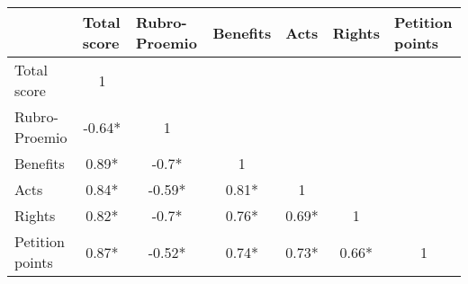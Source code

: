 \begin{tabular}{l|cccccc}
\toprule
\multicolumn{1}{r}{} & \multicolumn{1}{l}{Total score} & \multicolumn{1}{l}{Rubro-Proemio} & \multicolumn{1}{l}{Benefits} & \multicolumn{1}{l}{Acts} & \multicolumn{1}{l}{Rights} & \multicolumn{1}{l}{Petition points} \\
\midrule
\midrule
Total score & 1     &       &       &       &       &  \\
Rubro-Proemio & -0.64* & 1     &       &       &       &  \\
Benefits & 0.89* & -0.7* & 1     &       &       &  \\
Acts  & 0.84* & -0.59* & 0.81* & 1     &       &  \\
Rights & 0.82* & -0.7* & 0.76* & 0.69* & 1     &  \\
Petition points & 0.87* & -0.52* & 0.74* & 0.73* & 0.66* & 1 \\
\bottomrule
\bottomrule
\end{tabular}%
